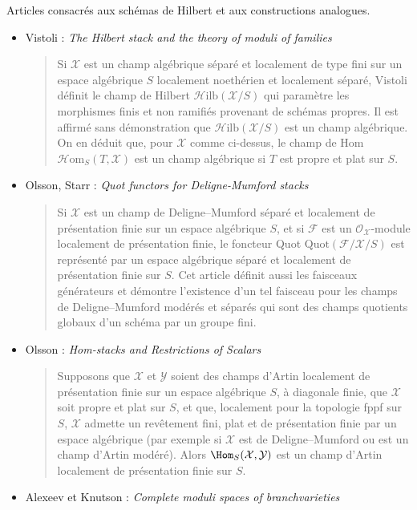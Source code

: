 \noindent
Articles consacrés aux schémas de Hilbert et aux constructions analogues.
\begin{itemize}
\item Vistoli : \emph{The Hilbert stack and the theory of moduli of families}
\cite{vistoli_hilbert}
\begin{quote}
Si $\mathcal{X}$ est un champ algébrique séparé et localement de type fini sur
un espace algébrique $S$ localement noethérien et localement séparé, Vistoli
définit le champ de Hilbert $\mathcal{H}\text{ilb}(\mathcal{X} / S)$ qui
paramètre les morphismes finis et non ramifiés provenant de schémas propres.
Il est affirmé sans démonstration que
$\mathcal{H}\text{ilb}(\mathcal{X} / S)$ est un champ algébrique. On en déduit
que, pour $\mathcal{X}$ comme ci-dessus, le champ de Hom
$\mathcal{H} \text{om}_S(T, \mathcal{X})$ est un champ algébrique si $T$ est
propre et plat sur $S$.
\end{quote}
\item Olsson, Starr : \emph{Quot functors for Deligne-Mumford stacks}
\cite{olsson-starr}
\begin{quote}
Si $\mathcal{X}$ est un champ de Deligne--Mumford séparé et localement de
présentation finie sur un espace algébrique $S$, et si $\mathcal{F}$ est un
$\mathcal{O}_\mathcal{X}$-module localement de présentation finie, le foncteur
Quot $\text{Quot}(\mathcal{F} / \mathcal{X} / S)$ est représenté par un espace
algébrique séparé et localement de présentation finie sur $S$. Cet article
définit aussi les faisceaux générateurs et démontre l'existence d'un tel
faisceau pour les champs de Deligne--Mumford modérés et séparés qui sont des
champs quotients globaux d'un schéma par un groupe fini.
\end{quote}
\item Olsson : \emph{Hom-stacks and Restrictions of Scalars}
\cite{olsson_homstacks}
\begin{quote}
Supposons que $\mathcal{X}$ et $\mathcal{Y}$ soient des champs d'Artin
localement de présentation finie sur un espace algébrique $S$, à diagonale
finie, que $\mathcal{X}$ soit propre et plat sur $S$, et que, localement pour
la topologie fppf sur $S$, $\mathcal{X}$ admette un revêtement fini, plat et de
présentation finie par un espace algébrique (par exemple si $\mathcal{X}$ est
de Deligne--Mumford ou est un champ d'Artin modéré). Alors
$\Hom_S(\mathcal{X}, \mathcal{Y})$ est un champ d'Artin localement de
présentation finie sur $S$.
\end{quote}
\item Alexeev et Knutson : \emph{Complete moduli spaces of branchvarieties}

\end{itemize}
